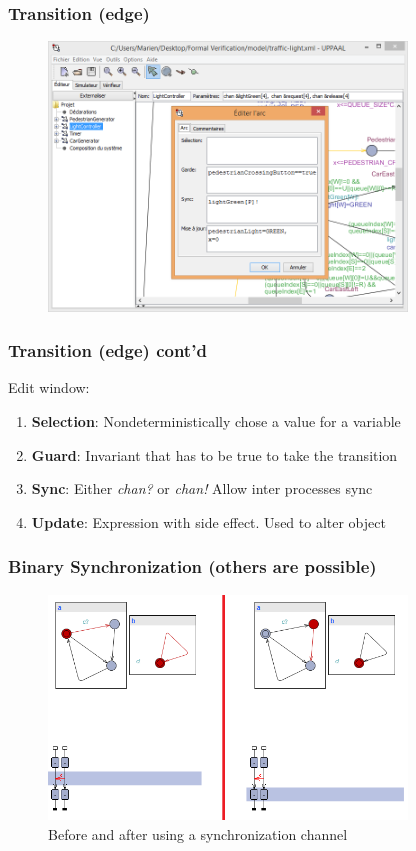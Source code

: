 \documentclass{beamer}
\begin{document}
\begin{frame}
	\frametitle{Transition (edge)}
	\begin{figure}
    	\centering
    	\includegraphics[width = 0.85\textwidth]{uppaal_edge_editor.png}
  	\end{figure}
\end{frame}

\begin{frame}
	\frametitle{Transition (edge) cont'd}
	\begin{block}{Edit window:}
		\begin{enumerate}
			\item \textbf{Selection}: Nondeterministically chose a value for a variable
			\item \textbf{Guard}: Invariant that has to be true to take the transition
			\item \textbf{Sync}: Either \textit{chan?} or \textit{chan!} Allow inter processes sync
			\item \textbf{Update}: Expression with side effect. Used to alter object
		\end{enumerate}
	\end{block}
\end{frame}

\begin{frame}
	\frametitle{Binary Synchronization (others are possible)}
	\begin{figure}
    	\centering
    	\includegraphics[width = 0.85\textwidth]{sync_before_after.png}
    	\caption{Before and after using a synchronization channel}
  	\end{figure}
\end{frame}
\end{document}
